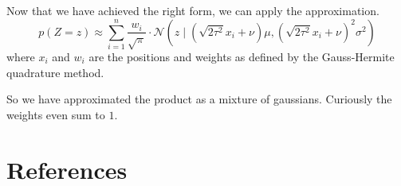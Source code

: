 \documentclass[11pt,a4paper]{report}
\begin{document}
Now that we have achieved the right form, we can apply the approximation.
\begin{equation*}
  p(Z = z) \approx \sum_{i = 1}^{n} \frac{w_{i}}{\sqrt{\pi}} \cdot \mathcal{N}\left( z \mid \left(\sqrt{2 \tau^{2}} x_{i} + \nu\right)\mu, \left(\sqrt{2 \tau^{2}} x_{i} + \nu\right)^{2}\sigma^{2} \right)
\end{equation*}
where $x_{i}$ and $w_{i}$ are the positions and weights as defined by the
Gauss-Hermite quadrature method.

So we have approximated the product as a mixture of gaussians. Curiously the
weights even sum to $1$.

\chapter{References}

\printbibliography
\end{document}
